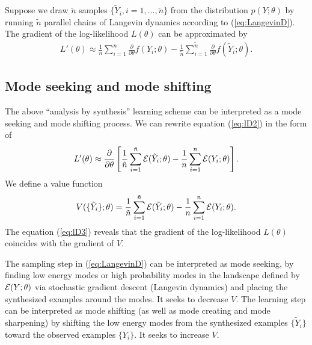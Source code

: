 \documentclass[10pt,twocolumn,letterpaper]{article}
\def\tY{\tilde{Y}}
\begin{document}
Suppose we draw $\tilde{n}$ samples $\{ \tY_i, i=1,...,\tilde{n} \}$ from the distribution $p(Y;\theta)$ by running $\tilde{n}$ parallel chains of Langevin dynamics according to (\ref{eq:LangevinD}). The gradient of the log-likelihood $L{(\theta)}$ can be approximated by 
  \begin{eqnarray} 
  L'(\theta) \approx \frac{1}{n} \sum_{i=1}^{n} \frac{\partial}{\partial \theta} f(Y_i; \theta) - \frac{1}{\tilde{n}} \sum_{i=1}^{ \tilde{n} } \frac{\partial}{\partial \theta} f(\tilde Y_i; \theta).  \label{eq:lD2}
\end{eqnarray}
 
 
 \subsection{Mode seeking and mode shifting} 
 
The above ``analysis by synthesis'' learning scheme can be interpreted as a mode seeking and mode shifting process. We can rewrite equation (\ref{eq:lD2}) in the form of  
 \begin{eqnarray} 
  L'(\theta) \approx \frac{\partial}{\partial \theta} \left[ \frac{1}{\tilde{n}} \sum_{i=1}^{ \tilde{n} }   {\cal E}(\tilde Y_i; \theta) - \frac{1}{n} \sum_{i=1}^{n}   {\cal E}(Y_i; \theta) \right]. \label{eq:lD3}
\end{eqnarray}
We define a value function
 \begin{eqnarray} 
 V(\{\tY_i\}; \theta) = \frac{1}{\tilde{n}} \sum_{i=1}^{ \tilde{n} }   {\cal E}(\tilde Y_i; \theta) - \frac{1}{n} \sum_{i=1}^{n}   {\cal E}(Y_i; \theta). \label{eq:V}
\end{eqnarray}
The equation (\ref{eq:lD3}) reveals that the gradient of the log-likelihood $L{(\theta)}$ coincides with the gradient of $V$. 

The sampling step in (\ref{eq:LangevinD}) can be interpreted as mode seeking, by finding low energy modes or high probability modes in the landscape defined by $ {\cal E}(Y;\theta)$ via stochastic gradient descent (Langevin dynamics) and placing the synthesized examples around the modes. It seeks to decrease $V$.   The learning step can be interpreted as mode shifting (as well as mode creating and mode sharpening) by shifting the low energy modes from the synthesized examples $\{\tY_i\}$ toward the observed examples $\{Y_i\}$. It seeks to increase $V$. 

\end{document}
